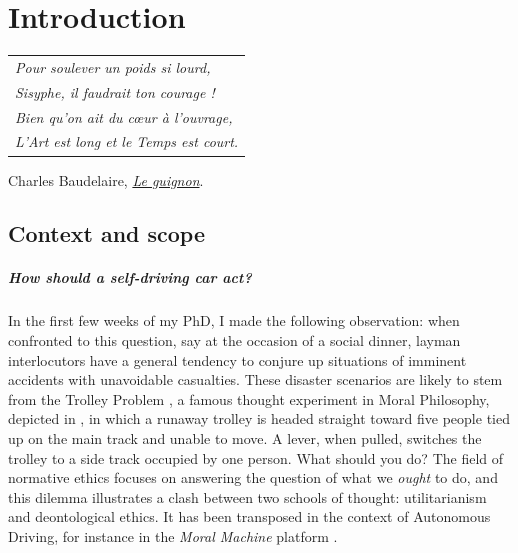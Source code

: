 
\graphicspath{{2-Chapters/1-Chapter/}}

\chapter{Introduction}
\label{chapter:1}

\begin{flushright}
	\begin{tabular}{@{}l@{}}
		\emph{Pour soulever un poids si lourd,}\\
		\emph{Sisyphe, il faudrait ton courage !}\\
		\emph{Bien qu’on ait du cœur à l’ouvrage,}\\
		\emph{L’Art est long et le Temps est court.}\\
	\end{tabular}

	Charles Baudelaire, \href{https://eleurent.github.io/sisyphe/texts/le-guignon.html}{\emph{Le guignon}}.
\end{flushright}

\section{Context and scope}


\paragraph{How should a self-driving car act?}

In the first few weeks of my PhD, I made the following observation: when confronted to this question, say at the occasion of a social dinner, layman interlocutors have a general tendency to conjure up situations of imminent accidents with unavoidable casualties. 
These disaster scenarios are likely to stem from the Trolley Problem \citep{Foot1967}, a famous thought experiment in Moral Philosophy, depicted in , in which a runaway trolley is headed straight toward five people tied up on the main track and unable to move. A lever, when pulled, switches the trolley to a side track occupied by one person. What should you do? The field of normative ethics focuses on answering the question of what we \emph{ought} to do, and this dilemma illustrates a clash between two schools of thought: utilitarianism and deontological ethics. 
It has been transposed in the context of Autonomous Driving, for instance in the \emph{Moral Machine} platform \citep{Awad2018}.

